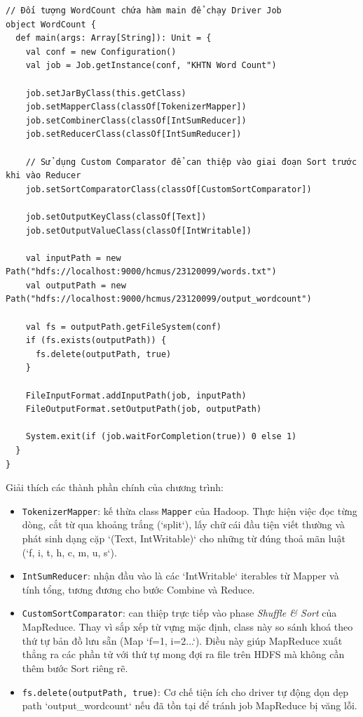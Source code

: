\begin{verbatim}
// Đối tượng WordCount chứa hàm main để chạy Driver Job
object WordCount {
  def main(args: Array[String]): Unit = {
    val conf = new Configuration()
    val job = Job.getInstance(conf, "KHTN Word Count")

    job.setJarByClass(this.getClass)
    job.setMapperClass(classOf[TokenizerMapper])
    job.setCombinerClass(classOf[IntSumReducer])
    job.setReducerClass(classOf[IntSumReducer])

    // Sử dụng Custom Comparator để can thiệp vào giai đoạn Sort trước khi vào Reducer
    job.setSortComparatorClass(classOf[CustomSortComparator])

    job.setOutputKeyClass(classOf[Text])
    job.setOutputValueClass(classOf[IntWritable])

    val inputPath = new Path("hdfs://localhost:9000/hcmus/23120099/words.txt")
    val outputPath = new Path("hdfs://localhost:9000/hcmus/23120099/output_wordcount")

    val fs = outputPath.getFileSystem(conf)
    if (fs.exists(outputPath)) {
      fs.delete(outputPath, true)
    }

    FileInputFormat.addInputPath(job, inputPath)
    FileOutputFormat.setOutputPath(job, outputPath)

    System.exit(if (job.waitForCompletion(true)) 0 else 1)
  }
}
\end{verbatim}

Giải thích các thành phần chính của chương trình:

\begin{itemize}
  \item \texttt{TokenizerMapper}: kế thừa class \texttt{Mapper} của Hadoop. Thực hiện việc đọc từng dòng, cắt từ qua khoảng trắng (`split`), lấy chữ cái đầu tiện viết thường và phát sinh dạng cặp `(Text, IntWritable)` cho những từ đúng thoả mãn luật (`f, i, t, h, c, m, u, s`).
  \item \texttt{IntSumReducer}: nhận đầu vào là các `IntWritable` iterables từ Mapper và tính tổng, tương đương cho bước Combine và Reduce.
  \item \texttt{CustomSortComparator}: can thiệp trực tiếp vào phase \textit{Shuffle \& Sort} của MapReduce. Thay vì sắp xếp từ vựng mặc định, class này so sánh khoá theo thứ tự bản đồ lưu sẵn (Map `f=1, i=2...`). Điều này giúp MapReduce xuất thẳng ra các phần tử với thứ tự mong đợi ra file trên HDFS mà không cần thêm bước Sort riêng rẽ.
  \item \texttt{fs.delete(outputPath, true)}: Cơ chế tiện ích cho driver tự động dọn dẹp path `output_wordcount` nếu đã tồn tại để tránh job MapReduce bị văng lỗi.
\end{itemize}

